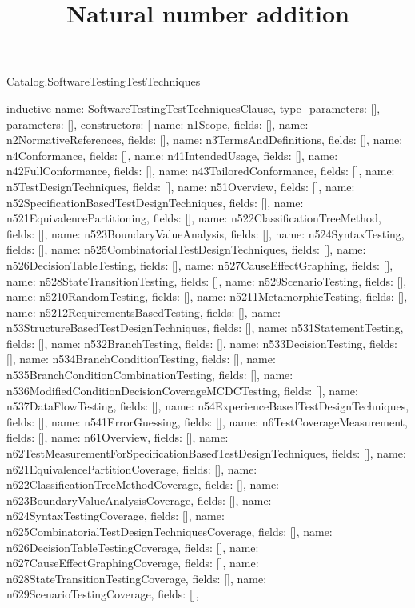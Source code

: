 \begin{lexlean}{Catalog.SoftwareTestingTestTechniques}
\title{Natural number addition}
\begin{semanticmodule}
inductive{
  name: SoftwareTestingTestTechniquesClause,
  type_parameters: [],
  parameters: [],
  constructors: [
    {name: n1Scope, fields: []},
    {name: n2NormativeReferences, fields: []},
    {name: n3TermsAndDefinitions, fields: []},
    {name: n4Conformance, fields: []},
    {name: n41IntendedUsage, fields: []},
    {name: n42FullConformance, fields: []},
    {name: n43TailoredConformance, fields: []},
    {name: n5TestDesignTechniques, fields: []},
    {name: n51Overview, fields: []},
    {name: n52SpecificationBasedTestDesignTechniques, fields: []},
    {name: n521EquivalencePartitioning, fields: []},
    {name: n522ClassificationTreeMethod, fields: []},
    {name: n523BoundaryValueAnalysis, fields: []},
    {name: n524SyntaxTesting, fields: []},
    {name: n525CombinatorialTestDesignTechniques, fields: []},
    {name: n526DecisionTableTesting, fields: []},
    {name: n527CauseEffectGraphing, fields: []},
    {name: n528StateTransitionTesting, fields: []},
    {name: n529ScenarioTesting, fields: []},
    {name: n5210RandomTesting, fields: []},
    {name: n5211MetamorphicTesting, fields: []},
    {name: n5212RequirementsBasedTesting, fields: []},
    {name: n53StructureBasedTestDesignTechniques, fields: []},
    {name: n531StatementTesting, fields: []},
    {name: n532BranchTesting, fields: []},
    {name: n533DecisionTesting, fields: []},
    {name: n534BranchConditionTesting, fields: []},
    {name: n535BranchConditionCombinationTesting, fields: []},
    {name: n536ModifiedConditionDecisionCoverageMCDCTesting, fields: []},
    {name: n537DataFlowTesting, fields: []},
    {name: n54ExperienceBasedTestDesignTechniques, fields: []},
    {name: n541ErrorGuessing, fields: []},
    {name: n6TestCoverageMeasurement, fields: []},
    {name: n61Overview, fields: []},
    {name: n62TestMeasurementForSpecificationBasedTestDesignTechniques, fields: []},
    {name: n621EquivalencePartitionCoverage, fields: []},
    {name: n622ClassificationTreeMethodCoverage, fields: []},
    {name: n623BoundaryValueAnalysisCoverage, fields: []},
    {name: n624SyntaxTestingCoverage, fields: []},
    {name: n625CombinatorialTestDesignTechniquesCoverage, fields: []},
    {name: n626DecisionTableTestingCoverage, fields: []},
    {name: n627CauseEffectGraphingCoverage, fields: []},
    {name: n628StateTransitionTestingCoverage, fields: []},
    {name: n629ScenarioTestingCoverage, fields: []},
}
\end{semanticmodule}
\end{lexlean}

